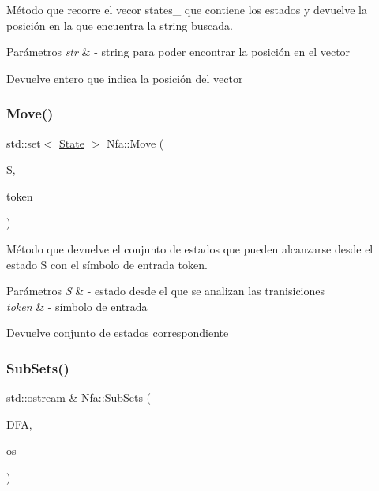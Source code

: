 Método que recorre el vecor states\+\_\+ que contiene los estados y devuelve la posición en la que encuentra la string buscada. 


\begin{DoxyParams}{Parámetros}
{\em str} & -\/ string para poder encontrar la posición en el vector \\
\hline
\end{DoxyParams}
\begin{DoxyReturn}{Devuelve}
entero que indica la posición del vector 
\end{DoxyReturn}
\mbox{\label{classNfa_a13e99ae74bbd1172e9502c5218b24616}} 
\subsubsection{\texorpdfstring{Move()}{Move()}}
{\footnotesize\ttfamily std\+::set$<$ \hyperlink{classState}{State} $>$ Nfa\+::\+Move (\begin{DoxyParamCaption}\item[{std\+::set$<$ \hyperlink{classState}{State} $>$}]{S,  }\item[{char}]{token }\end{DoxyParamCaption})}



Método que devuelve el conjunto de estados que pueden alcanzarse desde el estado S con el símbolo de entrada token. 


\begin{DoxyParams}{Parámetros}
{\em S} & -\/ estado desde el que se analizan las tranisiciones \\
\hline
{\em token} & -\/ símbolo de entrada \\
\hline
\end{DoxyParams}
\begin{DoxyReturn}{Devuelve}
conjunto de estados correspondiente 
\end{DoxyReturn}
\mbox{\label{classNfa_a76d0f776ed9fa7d291c387db466369c3}} 
\subsubsection{\texorpdfstring{Sub\+Sets()}{SubSets()}}
{\footnotesize\ttfamily std\+::ostream \& Nfa\+::\+Sub\+Sets (\begin{DoxyParamCaption}\item[{\hyperlink{classDfa}{Dfa} \&}]{D\+FA,  }\item[{std\+::ostream \&}]{os }\end{DoxyParamCaption})}



